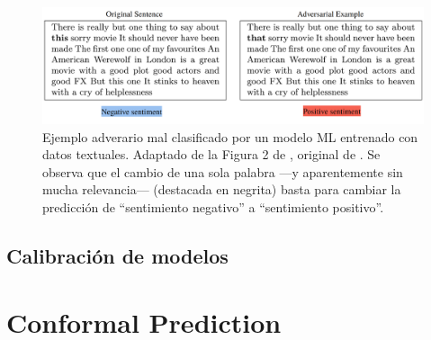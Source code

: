 \begin{figure}[h]
    \centering
    \includegraphics[width=\textwidth]{capitulos/cap_02/imagenes/adversarial_example.png}
    \caption[
        Ejemplo adverario mal clasificado por un modelo ML entrenado con datos textuales.
        Adaptado de la Figura 2 de \cite{hullermeier2021}, original de \cite{sato2018}.
    ]{
        Ejemplo adverario mal clasificado por un modelo ML entrenado con datos textuales.
        Adaptado de la Figura 2 de \cite{hullermeier2021}, original de \cite{sato2018}.
        Se observa que el cambio de una sola palabra ---y aparentemente sin mucha relevancia--- (destacada en 
        negrita) basta para cambiar la predicción de ``sentimiento negativo'' a ``sentimiento positivo''.
    } 
    \label{fig:adversarial_example}
\end{figure}


\subsection{Calibración de modelos}










\section{Conformal Prediction}


